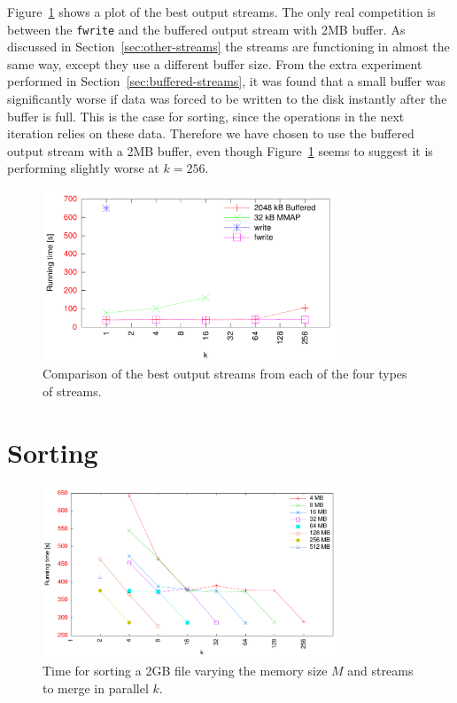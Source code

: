 \documentclass[a4paper,12pt]{article}
\begin{document}
Figure~\ref{fig:best-output} shows a plot of the best output
streams. The only real competition is between the \texttt{fwrite} and
the buffered output stream with 2MB buffer. As discussed in
Section~\ref{sec:other-streams} the streams are functioning in almost
the same way, except they use a different buffer size. From the extra
experiment performed in Section~\ref{sec:buffered-streams}, it was
found that a small buffer was significantly worse if data was forced
to be written to the disk instantly after the buffer is full. This is
the case for sorting, since the operations in the next iteration
relies on these data. Therefore we have chosen to use the buffered
output stream with a 2MB buffer, even though
Figure~\ref{fig:best-output} seems to suggest it is performing
slightly worse at $k = 256$.

\begin{figure}[h!]
  \centering
  \includegraphics[width=0.8\textwidth]{best_output}
  \caption{Comparison of the best output streams from each of the four
    types of streams.}
  \label{fig:best-output}
\end{figure}

\section{Sorting}

\begin{figure}[h!]
  \centering
  \includegraphics[width=0.8\textwidth]{sorting}
  \caption{Time for sorting a 2GB file varying the memory size $M$ and
    streams to merge in parallel $k$.}
  \label{fig:sorting}
\end{figure}
\end{document}
